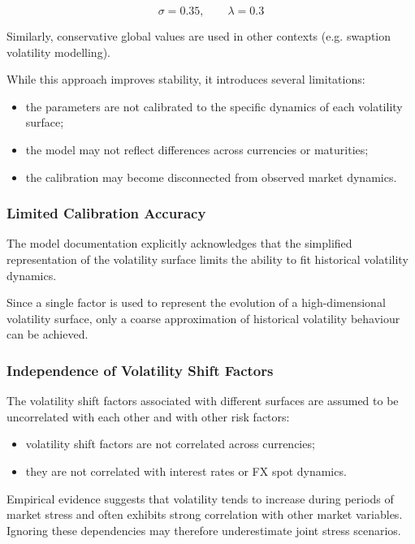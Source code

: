 \begin{equation}
	\sigma = 0.35, \qquad \lambda = 0.3
\end{equation}

Similarly, conservative global values are used in other contexts (e.g. swaption volatility modelling).

While this approach improves stability, it introduces several limitations:

\begin{itemize}
	\item the parameters are not calibrated to the specific dynamics of each volatility surface;
	\item the model may not reflect differences across currencies or maturities;
	\item the calibration may become disconnected from observed market dynamics.
\end{itemize}

\subsubsection{Limited Calibration Accuracy}

The model documentation explicitly acknowledges that the simplified representation of the volatility surface limits the ability to fit historical volatility dynamics.

Since a single factor is used to represent the evolution of a high-dimensional volatility surface, only a coarse approximation of historical volatility behaviour can be achieved.

\subsubsection{Independence of Volatility Shift Factors}

The volatility shift factors associated with different surfaces are assumed to be uncorrelated with each other and with other risk factors:

\begin{itemize}
	\item volatility shift factors are not correlated across currencies;
	\item they are not correlated with interest rates or FX spot dynamics.
\end{itemize}

Empirical evidence suggests that volatility tends to increase during periods of market stress and often exhibits strong correlation with other market variables. Ignoring these dependencies may therefore underestimate joint stress scenarios.

